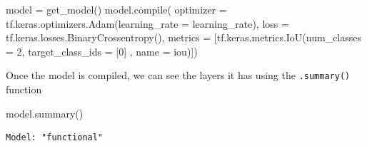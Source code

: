 \documentclass[
  letterpaper,
  DIV=11,
  numbers=noendperiod]{scrreprt}
\newenvironment{Shaded}{\begin{snugshade}}{\end{snugshade}}
\newcommand{\BuiltInTok}[1]{\textcolor[rgb]{0.00,0.23,0.31}{#1}}
\newcommand{\DecValTok}[1]{\textcolor[rgb]{0.68,0.00,0.00}{#1}}
\newcommand{\NormalTok}[1]{\textcolor[rgb]{0.00,0.23,0.31}{#1}}
\newcommand{\OperatorTok}[1]{\textcolor[rgb]{0.37,0.37,0.37}{#1}}
\newcommand{\StringTok}[1]{\textcolor[rgb]{0.13,0.47,0.30}{#1}}
\begin{document}
\begin{Shaded}
\begin{Highlighting}[]
\NormalTok{model }\OperatorTok{=}\NormalTok{ get\_model()}
\NormalTok{model.}\BuiltInTok{compile}\NormalTok{(}
\NormalTok{    optimizer }\OperatorTok{=}\NormalTok{ tf.keras.optimizers.Adam(learning\_rate }\OperatorTok{=}\NormalTok{ learning\_rate),}
\NormalTok{    loss }\OperatorTok{=}\NormalTok{ tf.keras.losses.BinaryCrossentropy(),}
\NormalTok{    metrics }\OperatorTok{=}\NormalTok{ [tf.keras.metrics.IoU(num\_classes }\OperatorTok{=} \DecValTok{2}\NormalTok{, target\_class\_ids }\OperatorTok{=}\NormalTok{ [}\DecValTok{0}\NormalTok{] , name }\OperatorTok{=} \StringTok{\textquotesingle{}iou\textquotesingle{}}\NormalTok{)])}
\end{Highlighting}
\end{Shaded}

Once the model is compiled, we can see the layers it has using the
\texttt{.summary()} function

\begin{Shaded}
\begin{Highlighting}[]
\NormalTok{model.summary()}
\end{Highlighting}
\end{Shaded}

\begin{verbatim}
Model: "functional"
\end{verbatim}
\end{document}
